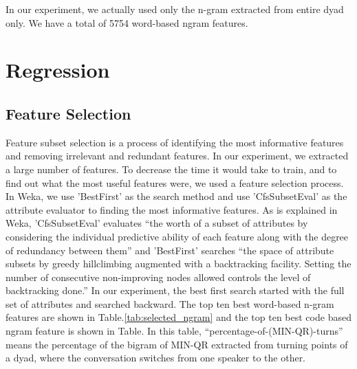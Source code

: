 \documentclass[11pt]{article} %
\begin{document}
In our experiment, we actually used only the n-gram extracted from entire dyad only. We have a total of 5754 word-based ngram features.

\section{Regression}
\subsection{Feature Selection}
\label{sec:fv_selection}
Feature subset selection is a process of identifying the most informative features and removing irrelevant and redundant features. In our experiment, we extracted a large number of features.  To decrease the time it would take to train, and to find out what the most useful features were, we used a feature selection process. In Weka, we use 'BestFirst' as the search method and use 'CfsSubsetEval' as the attribute evaluator to finding the most informative features. As is explained in Weka, 'CfsSubsetEval' evaluates ``the worth of a subset of attributes by considering the individual predictive ability of each feature along with the degree of redundancy between them'' and 'BestFirst' searches ``the space of attribute subsets by greedy hillclimbing augmented with a backtracking facility. Setting the number of consecutive non-improving nodes allowed controls the level of backtracking done.'' In our experiment, the best first search started with the full set of attributes and searched backward. The top ten best word-based n-gram features are shown in Table.\ref{tab:selected_ngram} and the top ten best code based ngram feature is shown in Table. In this table, ``percentage-of-(MIN-QR)-turns'' means the percentage of the bigram of MIN-QR extracted from turning points of a dyad, where the conversation switches from one speaker to the other.
\end{document}
